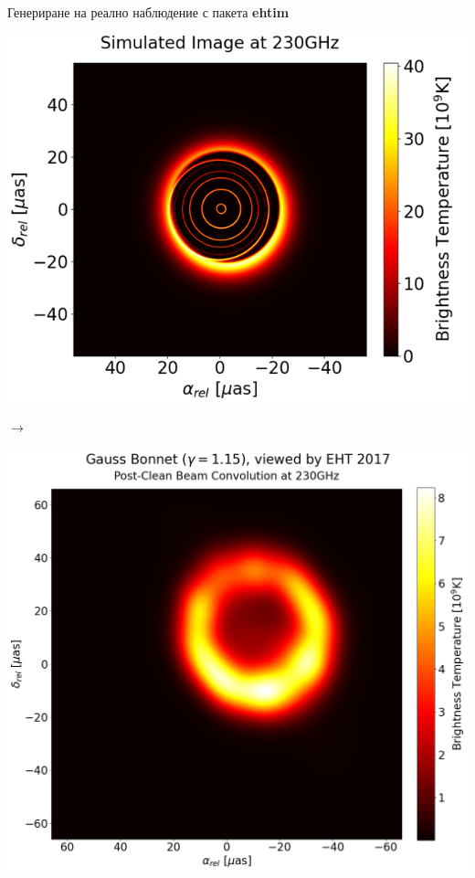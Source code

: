 \documentclass[hyperref={colorlinks,citecolor=blue,linkcolor=blue,urlcolor=blue}]{beamer}
\begin{document}
	\begin{frame}{Генериране на реално наблюдение с пакета \textbf{ehtim}}
			\centering
		\begin{minipage}{13em}
			\includegraphics[scale = 0.50]{Pre-Defence/GB_ray_tracer_230.png}
		\end{minipage}\qquad$\rightarrow$
		\begin{minipage}{13em}
			\includegraphics[scale = 0.14]{Pre-Defence/Ehtim_plot_2017.png}
		\end{minipage}\\
		

\end{frame}
\end{document}
